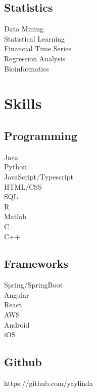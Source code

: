 \documentclass[letterpaper]{deedy-resume} %
\begin{document}
\begin{minipage}[t]{0.29\textwidth}
\sectionsep %

\subsection{Statistics}
\textbullet{} Data Mining\\
\textbullet{} Statistical Learning\\
\textbullet{} Financial Time Series\\
\textbullet{} Regression Analysis\\
\textbullet{} Bioinformatics\\

\sectionsep %


\section{Skills}

\subsection{Programming}

\textbullet{} Java\\
\textbullet{} Python\\
\textbullet{} JavaScript/Typescript\\
\textbullet{} HTML/CSS\\
\textbullet{} SQL\\
\textbullet{} R\\
\textbullet{} Matlab\\
\textbullet{} C\\
\textbullet{} C++

\sectionsep %

\subsection{Frameworks}
\textbullet{} Spring/SpringBoot\\
\textbullet{} Angular\\
\textbullet{} React\\
\textbullet{} AWS\\
\textbullet{} Android\\
\textbullet{} iOS\\

\sectionsep %

\subsection{Github}
\textbullet{} https://github.com/yaylinda


\end{minipage} %
\end{document}
